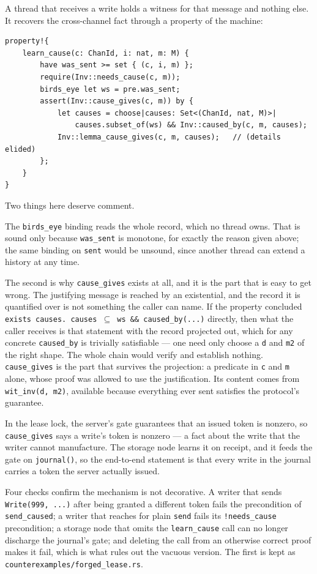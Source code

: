 \documentclass[11pt]{article}
\newcommand{\code}[1]{\texttt{#1}}
\newcommand{\srcname}[1]{%
  \vspace{0.9em}\noindent{\sffamily\scriptsize\color{comment}\MakeUppercase{#1}}\par
  \vspace{-0.7em}}
\begin{document}
A thread that receives a write holds a witness for that message and nothing
else. It recovers the cross-channel fact through a property of the machine:

\srcname{src/tok.rs --- reading provenance off a witness}
\begin{lstlisting}
property!{
    learn_cause(c: ChanId, i: nat, m: M) {
        have was_sent >= set { (c, i, m) };
        require(Inv::needs_cause(c, m));
        birds_eye let ws = pre.was_sent;
        assert(Inv::cause_gives(c, m)) by {
            let causes = choose|causes: Set<(ChanId, nat, M)>|
                causes.subset_of(ws) && Inv::caused_by(c, m, causes);
            Inv::lemma_cause_gives(c, m, causes);   // (details elided)
        };
    }
}
\end{lstlisting}

Two things here deserve comment.

The \code{birds\_eye} binding reads the whole record, which no thread owns. That
is sound only because \code{was\_sent} is monotone, for exactly the reason given
above; the same binding on \code{sent} would be unsound, since another thread
can extend a history at any time.

The second is why \code{cause\_gives} exists at all, and it is the part that is
easy to get wrong. The justifying message is reached by an existential, and the
record it is quantified over is not something the caller can name. If the
property concluded \code{exists causes. causes \(\subseteq\) ws \&\& caused\_by(...)}
directly, then what the caller receives is that statement with the record
projected out, which for any concrete \code{caused\_by} is trivially satisfiable
--- one need only choose a \code{d} and \code{m2} of the right shape. The whole
chain would verify and establish nothing. \code{cause\_gives} is the part that
survives the projection: a predicate in \code{c} and \code{m} alone, whose proof
was allowed to use the justification. Its content comes from
\code{wit\_inv(d, m2)}, available because everything ever sent satisfies the
protocol's guarantee.

In the lease lock, the server's gate guarantees that an issued token is nonzero,
so \code{cause\_gives} says a write's token is nonzero --- a fact about the write
that the writer cannot manufacture. The storage node learns it on receipt, and
it feeds the gate on \code{journal()}, so the end-to-end statement is that every
write in the journal carries a token the server actually issued.

Four checks confirm the mechanism is not decorative. A writer that sends
\code{Write(999, ...)} after being granted a different token fails the
precondition of \code{send\_caused}; a writer that reaches for plain \code{send}
fails its \code{!needs\_cause} precondition; a storage node that omits the
\code{learn\_cause} call can no longer discharge the journal's gate; and
deleting the call from an otherwise correct proof makes it fail, which is what
rules out the vacuous version. The first is kept as
\code{counterexamples/forged\_lease.rs}.
\end{document}

